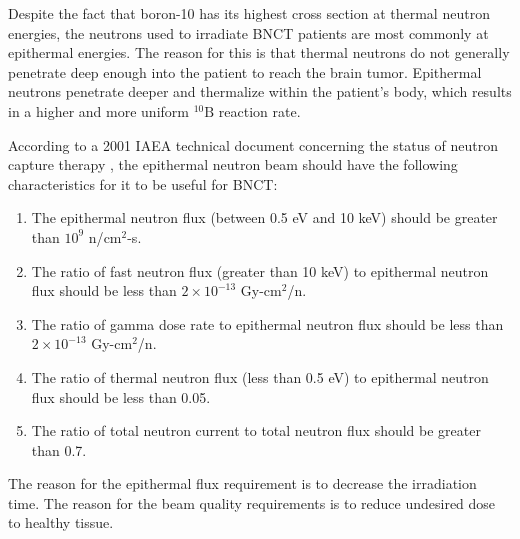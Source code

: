 Despite the fact that boron-10 has its highest cross section at thermal neutron energies, the neutrons used to irradiate BNCT patients are most commonly at epithermal energies.
The reason for this is that thermal neutrons do not generally penetrate deep enough into the patient to reach the brain tumor.
Epithermal neutrons penetrate deeper and thermalize within the patient's body, which results in a higher and more uniform ${}^{10}\text{B}$ reaction rate.

According to a 2001 IAEA technical document concerning the status of neutron capture therapy \cite{iaea2001}, the epithermal neutron beam should have the following characteristics for it to be useful for BNCT:
\begin{enumerate}
  \item The epithermal neutron flux (between 0.5 eV and 10 keV) should be greater than $10^9$ n/$\text{cm}^2$-s.
  \item The ratio of fast neutron flux (greater than 10 keV) to epithermal neutron flux should be less than $2\times 10^{-13}$ Gy-$\text{cm}^2$/n.
  \item The ratio of gamma dose rate to epithermal neutron flux should be less than $2\times 10^{-13}$ Gy-$\text{cm}^2$/n.
  \item The ratio of thermal neutron flux (less than 0.5 eV) to epithermal neutron flux should be less than 0.05.
  \item The ratio of total neutron current to total neutron flux should be greater than 0.7.
\end{enumerate}
The reason for the epithermal flux requirement is to decrease the irradiation time.
The reason for the beam quality requirements is to reduce undesired dose to healthy tissue.

